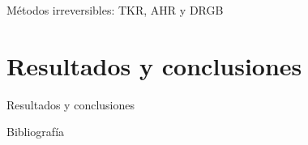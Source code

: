 \documentclass{beamer}
\begin{document}
  \begin{frame}{Métodos irreversibles: TKR, AHR y DRGB}

  \end{frame}

  \section{Resultados y conclusiones}

  \begin{frame}{Resultados y conclusiones}

  \end{frame}

  \begin{frame}[allowframebreaks]{Bibliografía}
    \printbibliography
  \end{frame}

  \setlength{\parskip}{0.0em}

  {
  \frame{\titlepage}}
\end{document}
